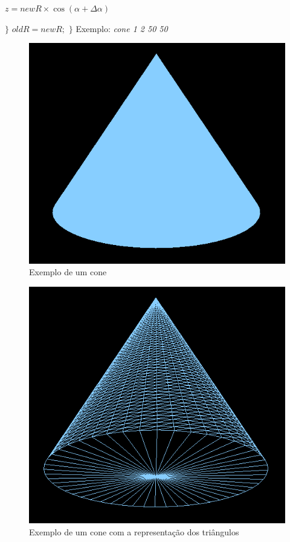 \documentclass[12pt]{article}
\begin{document}
\par$z = newR\times\cos(\alpha + \Delta\alpha)$ \newline\newline
\par $\}$ \newline\newline
$oldR = newR;$\newline\newline
$\}$
\newpage
Exemplo: \textit{cone 1 2 50 50}
\begin{figure}[H]
\centering\includegraphics[scale=0.45]{coneP} 
\caption{\label{fig:controller}Exemplo de um cone}
\end{figure} \begin{figure}[H]
\centering\includegraphics[scale=0.48]{coneT} 
\caption{\label{fig:controller}Exemplo de um cone com a representação dos triângulos}
\end{figure}
\newpage
\end{document}
